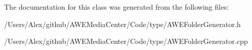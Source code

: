 The documentation for this class was generated from the following files\-:\begin{DoxyCompactItemize}
\item 
/\-Users/\-Alex/github/\-A\-W\-E\-Media\-Center/\-Code/type/A\-W\-E\-Folder\-Generator.\-h\item 
/\-Users/\-Alex/github/\-A\-W\-E\-Media\-Center/\-Code/type/A\-W\-E\-Folder\-Generator.\-cpp\end{DoxyCompactItemize}
